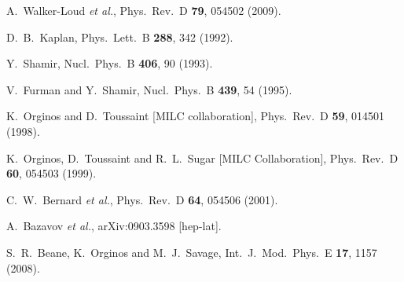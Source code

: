 \documentclass[twocolumn,nofootinbib,prd,aps,superscriptaddress,tightenlines]{revtex4}
\begin{document}
\begin{thebibliography}{99}
  A.~Walker-Loud {\it et al.},
  Phys.\ Rev.\  D {\bf 79}, 054502 (2009).

%
  D.~B.~Kaplan,
  Phys.\ Lett.\  B {\bf 288}, 342 (1992).

  Y.~Shamir,
  Nucl.\ Phys.\  B {\bf 406}, 90 (1993).

  V.~Furman and Y.~Shamir,
  Nucl.\ Phys.\  B {\bf 439}, 54 (1995).

  K.~Orginos and D.~Toussaint  [MILC collaboration],
  Phys.\ Rev.\  D {\bf 59}, 014501 (1998).

  K.~Orginos, D.~Toussaint and R.~L.~Sugar  [MILC Collaboration],
  Phys.\ Rev.\  D {\bf 60}, 054503 (1999).

  C.~W.~Bernard {\it et al.},
  Phys.\ Rev.\  D {\bf 64}, 054506 (2001).

  A.~Bazavov {\it et al.},
  arXiv:0903.3598 [hep-lat].

  S.~R.~Beane, K.~Orginos and M.~J.~Savage,
  Int.\ J.\ Mod.\ Phys.\  E {\bf 17}, 1157 (2008).


\end{thebibliography}
\end{document}
